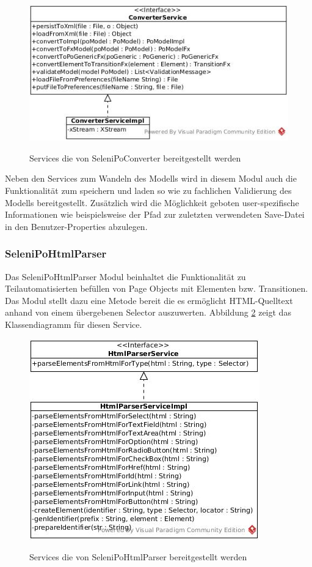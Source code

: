 \begin{figure}[htb]
  \centering  
  \includegraphics[scale=0.5]{img/ConverterService.jpg}\\
  \caption{Services die von SeleniPoConverter bereitgestellt werden}
  \label{fig:converter_service}
\end{figure}

Neben den Services zum Wandeln des Modells wird in diesem Modul auch die Funktionalität zum speichern und laden so wie zu fachlichen Validierung des Modells bereitgestellt.
Zusätzlich wird die Möglichkeit geboten user-spezifische Informationen wie beispielsweise der Pfad zur zuletzten verwendeten Save-Datei in den Benutzer-Properties abzulegen.


\subsubsection{SeleniPoHtmlParser}
\label{sec:selenipohtmlparser}

Das SeleniPoHtmlParser Modul beinhaltet die Funktionalität zu Teilautomatisierten befüllen von Page Objects mit Elementen bzw. Transitionen.
Das Modul stellt dazu eine Metode bereit die es ermöglicht HTML-Quelltext anhand von einem übergebenen Selector auszuwerten.
Abbildung \ref{fig:html_service} zeigt das Klassendiagramm für diesen Service.

\begin{figure}[htb]
  \centering  
  \includegraphics[scale=0.5]{img/HtmlParserService.jpg}\\
  \caption{Services die von SeleniPoHtmlParser bereitgestellt werden}
  \label{fig:html_service}
\end{figure}

